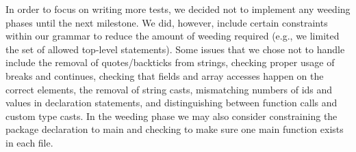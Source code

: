 \documentclass{article}
\begin{document}
In order to focus on writing more tests, we decided not to implement any weeding phases until the next milestone. We did, however, include certain constraints within our grammar to reduce the amount of weeding required (e.g., we limited the set of allowed top-level statements). Some issues that we chose not to handle include the removal of quotes/backticks from strings, checking proper usage of breaks and continues, checking that fields and array accesses happen on the correct elements, the removal of string casts, mismatching numbers of ids and values in declaration statements, and distinguishing between function calls and custom type casts. In the weeding phase we may also consider constraining the package declaration to main and checking to make sure one main function exists in each file.
\end{document}
